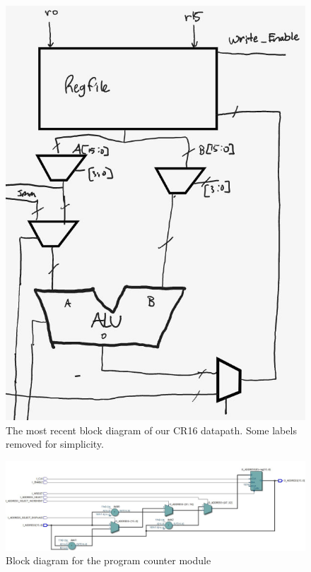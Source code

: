 \documentclass[conference]{IEEEtran}
\begin{document}
\begin{figure}[ht]
    \centering
    \includegraphics[scale=0.55]{resources/figures/datapath.jpg}
    \caption{The most recent block diagram of our CR16 datapath. Some labels removed for simplicity.}
    \label{fig:datapath}
\end{figure}

\begin{figure}[t]
    \centering
    \includegraphics[scale=0.5]{resources/figures/program_counter.jpg}
    \caption{Block diagram for the program counter module}
    \label{fig:program_counter}
\end{figure}
\end{document}
